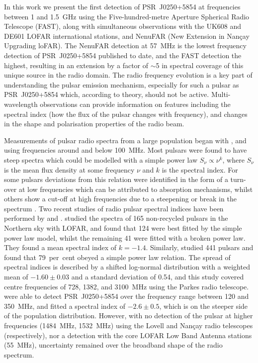 In this work we present the first detection of PSR~J0250+5854 at frequencies between 1 and 1.5~GHz using the Five-hundred-metre Aperture Spherical Radio Telescope (FAST), along with simultaneous observations with the UK608 and DE601 LOFAR international stations, and NenuFAR (New Extension in Nan\c{c}ay Upgrading loFAR). The NenuFAR detection at 57~MHz is the lowest frequency detection of PSR~J0250+5854 published to date, and the FAST detection the highest, resulting in an extension by a factor of $\sim$5 in spectral coverage of this unique source in the radio domain. The radio frequency evolution is a key part of understanding the pulsar emission mechanism, especially for such a pulsar as PSR~J0250+5854 which, according to theory, should not be active. Multi-wavelength observations can provide information on features including the spectral index (how the flux of the pulsar changes with frequency), and changes in the shape and polarisation properties of the radio beam.

Measurements of pulsar radio spectra from a large population began with \citet{Sxxx1973}, \citet{MMxx1980} and \citet{IKMS1981} using frequencies around and below 100~MHz. Most pulsars were found to have steep spectra which could be modelled with a simple power law $S_\nu \propto \nu^k$, where $S_\nu$ is the mean flux density at some frequency $\nu$ and $k$ is the spectral index. For some pulsars deviations from this relation were identified in the form of a turn-over at low frequencies which can be attributed to absorption mechanisms, whilst others show a cut-off at high frequencies due to a steepening or break in the spectrum \citep{Sxxx1973}. Two recent studies of radio pulsar spectral indices have been performed by \citet{BKK+2016} and \citet{JSK+2018}. \citet{BKK+2016} studied the spectra of 165 non-recycled pulsars in the Northern sky with LOFAR, and found that 124 were best fitted by the simple power law model, whilst the remaining 41 were fitted with a broken power law. They found a mean spectral index of $k = -1.4$. Similarly, \citet{JSK+2018} studied 441 pulsars and found that 79~per~cent obeyed a simple power law relation. The spread of spectral indices is described by a shifted log-normal distribution with a weighted mean of $-1.60\pm0.03$ and a standard deviation of 0.54, and this study covered centre frequencies of 728, 1382, and 3100~MHz using the Parkes radio telescope. \citet{TBC+2018} were able to detect PSR~J0250+5854 over the frequency range between 120 and 350~MHz, and fitted a spectral index of $-2.6\pm0.5$, which is on the steeper side of the population distribution. However, with no detection of the pulsar at higher frequencies (1484~MHz, 1532~MHz) using the Lovell and Nan\c{c}ay radio telescopes (respectively), nor a detection with the core LOFAR Low Band Antenna stations (55~MHz), uncertainty remained over the broadband shape of the radio spectrum. 

